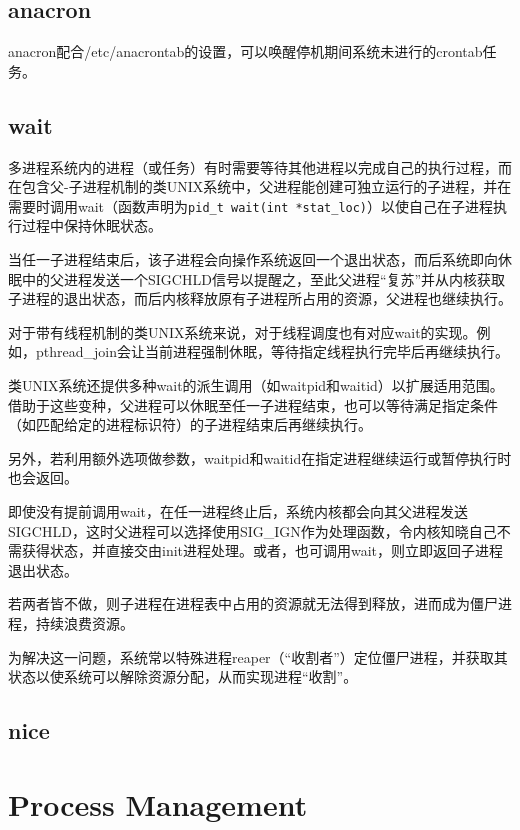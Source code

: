 \section{anacron}

anacron配合/etc/anacrontab的设置，可以唤醒停机期间系统未进行的crontab任务。


\section{wait}

多进程系统内的进程（或任务）有时需要等待其他进程以完成自己的执行过程，而在包含父-子进程机制的类UNIX系统中，父进程能创建可独立运行的子进程，并在需要时调用wait（函数声明为\texttt{pid\_t wait(int *stat\_loc)}）以使自己在子进程执行过程中保持休眠状态。

当任一子进程结束后，该子进程会向操作系统返回一个退出状态，而后系统即向休眠中的父进程发送一个SIGCHLD信号以提醒之，至此父进程“复苏”并从内核获取子进程的退出状态，而后内核释放原有子进程所占用的资源，父进程也继续执行。


对于带有线程机制的类UNIX系统来说，对于线程调度也有对应wait的实现。例如，pthread\_join会让当前进程强制休眠，等待指定线程执行完毕后再继续执行。

类UNIX系统还提供多种wait的派生调用（如waitpid和waitid）以扩展适用范围。借助于这些变种，父进程可以休眠至任一子进程结束，也可以等待满足指定条件（如匹配给定的进程标识符）的子进程结束后再继续执行。

另外，若利用额外选项做参数，waitpid和waitid在指定进程继续运行或暂停执行时也会返回。

即使没有提前调用wait，在任一进程终止后，系统内核都会向其父进程发送SIGCHLD，这时父进程可以选择使用SIG\_IGN作为处理函数，令内核知晓自己不需获得状态，并直接交由init进程处理。或者，也可调用wait，则立即返回子进程退出状态。

若两者皆不做，则子进程在进程表中占用的资源就无法得到释放，进而成为僵尸进程，持续浪费资源。

为解决这一问题，系统常以特殊进程reaper（“收割者”）定位僵尸进程，并获取其状态以使系统可以解除资源分配，从而实现进程“收割”。

\section{nice} 




\chapter{Process Management}

